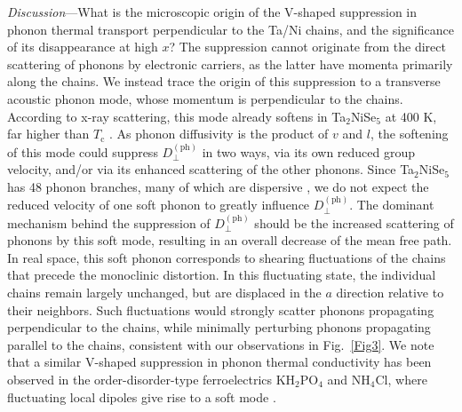 \documentclass[aps,prl,twocolumn,superscriptaddress]{revtex4-2}
\begin{document}
\textit{Discussion}---What is the microscopic origin of the V-shaped suppression in phonon thermal transport perpendicular to the Ta/Ni chains, and the significance of its disappearance at high $x$? The suppression cannot originate from the direct scattering of phonons by electronic carriers, as the latter have momenta primarily along the chains. We instead trace the origin of this suppression to a transverse acoustic phonon mode, whose momentum is perpendicular to the chains. According to x-ray scattering, this mode already softens in Ta$_2$NiSe$_5$ at 400 K, far higher than $T_\textrm{c}$ \cite{Nakano_PRB_2018, Kang_arXiv_2025}. As phonon diffusivity is the product of $v$ and $l$, the softening of this mode could suppress $D^{(\textrm{ph})}_{\perp}$ in two ways, via its own reduced group velocity, and/or via its enhanced scattering of the other phonons. Since Ta$_2$NiSe$_5$ has 48 phonon branches, many of which are dispersive \cite{Nakano_PRB_2018, Subedi_2020}, we do not expect the reduced velocity of one soft phonon to greatly influence $D^{(\textrm{ph})}_{\perp}$. The dominant mechanism behind the suppression of $D^{(\textrm{ph})}_{\perp}$ should be the increased scattering of phonons by this soft mode, resulting in an overall decrease of the mean free path. In real space, this soft phonon corresponds to shearing fluctuations of the chains that precede the monoclinic distortion. In this fluctuating state, the individual chains remain largely unchanged, but are displaced in the $a$ direction relative to their neighbors. Such fluctuations would strongly scatter phonons propagating perpendicular to the chains, while minimally perturbing phonons propagating parallel to the chains, consistent with our observations in Fig.~\ref{Fig3}. We note that a similar V-shaped suppression in phonon thermal conductivity has been observed in the order-disorder-type ferroelectrics KH$_2$PO$_4$ and NH$_4$Cl, where fluctuating local dipoles give rise to a soft mode \cite{Bausch_PLA_1969, Suemune_JPSJ_1967}.
\end{document}
